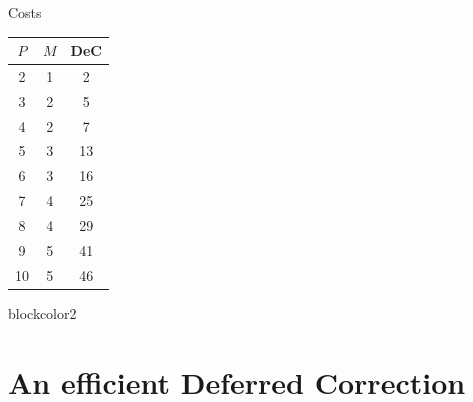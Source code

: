 \documentclass[9pt,compress,t,aspectratio=169]{beamer}
\begin{document}
\begin{frame}{Costs}
\begin{minipage}{0.28\textwidth}
		\begin{tabular}{|c|c||c|}\hline
			$P$ &$M$ & DeC\\ \hline
			2&1&2\\
			3&2&5\\
			4&2&7\\
			{\color{red}5}&3&{\color{red}13}\\
			6&3&16\\
			7&4&25\\
			8&4&29\\
			9&5&41\\
			10&5&46\\ \hline
		\end{tabular}
	\end{minipage}
	\vspace{5mm}
	\pause
	
	\begin{beamercolorbox}[sep=1em,wd=\textwidth]{blockcolor2}
		\centering
		\Large {}
	\end{beamercolorbox}
	\end{frame}
	
	
	\section{An efficient Deferred Correction}
	
\end{document}
